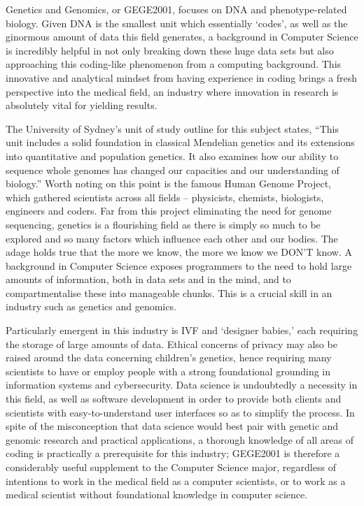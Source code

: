 Genetics and Genomics, or GEGE2001, focuses on DNA and phenotype-related biology. Given DNA is the smallest unit which essentially ‘codes’, as well as the ginormous amount of data this field generates, a background in Computer Science is incredibly helpful in not only breaking down these huge data sets but also approaching this coding-like phenomenon from a computing background. This innovative and analytical mindset from having experience in coding brings a fresh perspective into the medical field, an industry where innovation in research is absolutely vital for yielding results.


The University of Sydney’s unit of study outline for this subject states, “This unit includes a solid foundation in classical Mendelian genetics and its extensions into quantitative and population genetics. It also examines how our ability to sequence whole genomes has changed our capacities and our understanding of biology.” Worth noting on this point is the famous Human Genome Project, which gathered scientists across all fields – physicists, chemists, biologists, engineers and coders. Far from this project eliminating the need for genome sequencing, genetics is a flourishing field as there is simply so much to be explored and so many factors which influence each other and our bodies. The adage holds true that the more we know, the more we know we DON’T know. A background in Computer Science exposes programmers to the need to hold large amounts of information, both in data sets and in the mind, and to compartmentalise these into manageable chunks. This is a crucial skill in an industry such as genetics and genomics.


Particularly emergent in this industry is IVF and ‘designer babies,’ each requiring the storage of large amounts of data. Ethical concerns of privacy may also be raised around the data concerning children’s genetics, hence requiring many scientists to have or employ people with a strong foundational grounding in information systems and cybersecurity. Data science is undoubtedly a necessity in this field, as well as software development in order to provide both clients and scientists with easy-to-understand user interfaces so as to simplify the process. In spite of the misconception that data science would best pair with genetic and genomic research and practical applications, a thorough knowledge of all areas of coding is practically a prerequisite for this industry; GEGE2001 is therefore a considerably useful supplement to the Computer Science major, regardless of intentions to work in the medical field as a computer scientists, or to work as a medical scientist without foundational knowledge in computer science.


